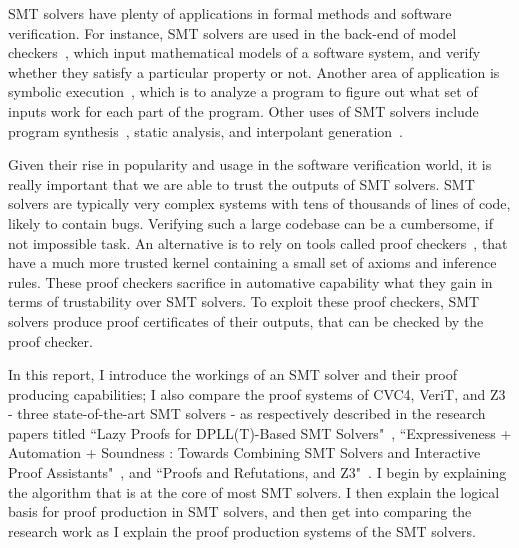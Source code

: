 \documentclass{article}
\begin{document}
SMT solvers have plenty of applications in formal methods 
and software verification. For instance, SMT solvers are used 
in the back-end of model checkers~\cite{DBLP:books/daglib/0020348}, 
which input mathematical 
models of a software system, and verify whether they 
satisfy a particular property or not. Another area of 
application is symbolic
execution~\cite{DBLP:journals/csur/BaldoniCDDF18}, 
which is to analyze a 
program to figure out what set of inputs work for each 
part of the program. Other uses of SMT solvers include 
program synthesis~\cite{synth}, static analysis, 
and interpolant generation~\cite{DBLP:journals/corr/abs-1111-5652}.

Given their rise in popularity and usage in the software 
verification world, it is really important that we are able 
to trust the outputs of SMT solvers. SMT solvers are typically 
very complex systems with tens of thousands of lines of code, 
likely to contain bugs. Verifying such a large codebase can 
be a cumbersome, if not impossible task. An alternative is 
to rely on tools called proof checkers~\cite{proofasst}, 
that have a much more trusted kernel containing a small 
set of axioms and inference rules. These proof checkers 
sacrifice in automative capability what they gain in terms 
of trustability over SMT solvers. To exploit these proof 
checkers, SMT solvers produce proof certificates of their 
outputs, that can be checked by the proof checker.

In this report, I introduce the workings of an SMT solver 
and their proof producing capabilities; I also compare the 
proof systems of CVC4, VeriT, and Z3 - three 
state-of-the-art SMT solvers - as respectively 
described in the research papers titled ``Lazy Proofs for 
DPLL(T)-Based SMT Solvers"~\cite{DBLP:conf/fmcad/KatzBTRH16}, 
``Expressiveness + Automation + Soundness : 
Towards Combining SMT Solvers and Interactive 
Proof Assistants"~\cite{DBLP:conf/tacas/FontaineMMNT06}, 
and ``Proofs and Refutations, and Z3"~\cite{DBLP:conf/lpar/MouraB08}.
I begin by explaining the algorithm that is at the core 
of most SMT solvers. I then explain the logical basis for 
proof production in SMT solvers, and then get into 
comparing the research work as I explain the proof 
production systems of the SMT solvers.
\end{document}
